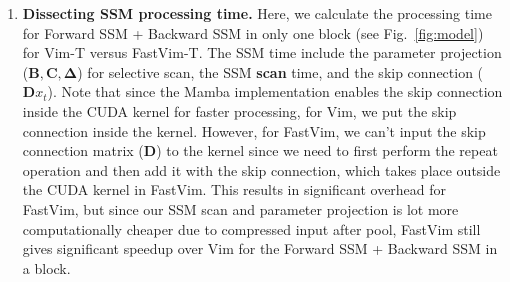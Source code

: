 \begin{enumerate}
\begin{table*}[!h]
    \caption{Dissecting SSM processing time (in milliseconds) at inference for only the Forward and Backward SSM layer in one block of Vim-T versus FastVim-T. For Vim, SSM includes parameter projection + SSM scan (with skip connection in CUDA kernel); for FastVim, pool + parameter projection + SSM scan + repeat + skip connection. Note that since skip connection is added in CUDA kernel for SSM scan for Vim, we don't report the time for skip-conn. separately for Vim.}
    \begin{center}
\end{center}
    \label{tab:dissecting_SSM_time}
\end{table*}

\item \textbf{Dissecting SSM processing time.} Here, we calculate the processing time for Forward SSM + Backward SSM in only one block (see Fig.~\ref{fig:model}) for Vim-T versus FastVim-T. The SSM time include the parameter projection (\(\mathbf{B}, \mathbf{C}, \mathbf{\Delta}\)) for selective scan, the SSM \textbf{scan} time, and the skip connection (\(\mathbf{D} x_t\)). Note that since the Mamba implementation enables the skip connection inside the CUDA kernel for faster processing, for Vim, we put the skip connection inside the kernel. However, for FastVim, we can't input the skip connection matrix (\(\mathbf{D}\)) to the kernel since we need to first perform the repeat operation and then add it with the skip connection, which takes place outside the CUDA kernel in FastVim. This results in significant overhead for FastVim, but since our SSM scan and parameter projection is lot more computationally cheaper due to compressed input after pool, FastVim still gives significant speedup over Vim for the Forward SSM + Backward SSM in a block. 


\end{enumerate}
